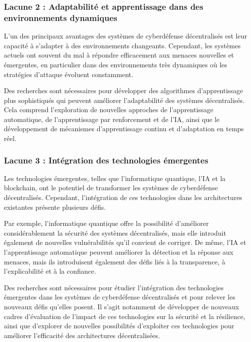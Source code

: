 \subsubsection{Lacune 2 : Adaptabilité et apprentissage dans des environnements dynamiques}

L’un des principaux avantages des systèmes de cyberdéfense décentralisés est leur capacité à s’adapter à des environnements changeants. Cependant, les systèmes actuels ont souvent du mal à répondre efficacement aux menaces nouvelles et émergentes, en particulier dans des environnements très dynamiques où les stratégies d’attaque évoluent constamment.

Des recherches sont nécessaires pour développer des algorithmes d’apprentissage plus sophistiqués qui peuvent améliorer l’adaptabilité des systèmes décentralisés. Cela comprend l’exploration de nouvelles approches de l’apprentissage automatique, de l’apprentissage par renforcement et de l’IA, ainsi que le développement de mécanismes d’apprentissage continu et d’adaptation en temps réel.


\subsubsection{Lacune 3 : Intégration des technologies émergentes}

Les technologies émergentes, telles que l’informatique quantique, l’IA et la blockchain, ont le potentiel de transformer les systèmes de cyberdéfense décentralisés. Cependant, l’intégration de ces technologies dans les architectures existantes présente plusieurs défis.

Par exemple, l’informatique quantique offre la possibilité d’améliorer considérablement la sécurité des systèmes décentralisés, mais elle introduit également de nouvelles vulnérabilités qu’il convient de corriger. De même, l’IA et l’apprentissage automatique peuvent améliorer la détection et la réponse aux menaces, mais ils introduisent également des défis liés à la transparence, à l’explicabilité et à la confiance.

Des recherches sont nécessaires pour étudier l’intégration des technologies émergentes dans les systèmes de cyberdéfense décentralisés et pour relever les nouveaux défis qu’elles posent. Il s’agit notamment de développer de nouveaux cadres d’évaluation de l’impact de ces technologies sur la sécurité et la résilience, ainsi que d’explorer de nouvelles possibilités d’exploiter ces technologies pour améliorer l’efficacité des architectures décentralisées.


